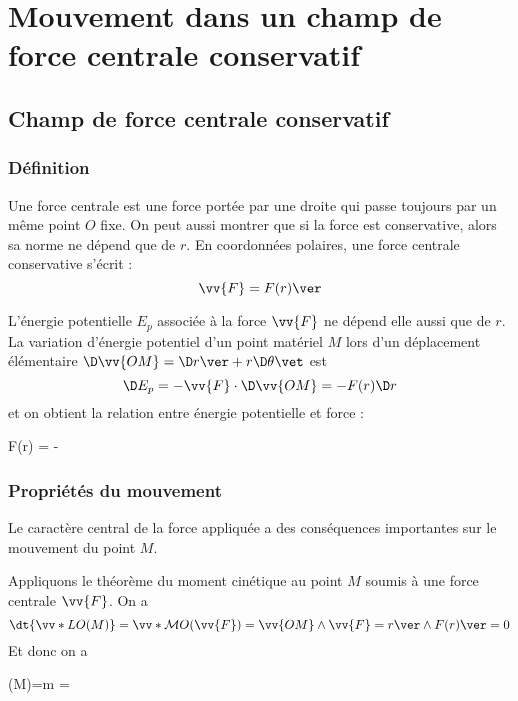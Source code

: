 \documentclass{cours}
\begin{document}
\setcounter{chapter}{17}

\chapter{Mouvement dans un champ de force centrale conservatif}

\section{Champ de force centrale conservatif}%
\label{sec:champ_de_force_centrale}

\subsection{Définition}%
\label{sub:definition}
\begin{definition}
  Une force centrale est une force portée par une droite qui passe toujours par un même point $O$ fixe. On peut aussi montrer que si la force est conservative, alors sa norme ne dépend que de $r$. En coordonnées polaires, une force centrale conservative s'écrit :
  \begin{equation}
   \vv{F} = F(r) \ver
  \end{equation}
\end{definition}
L'énergie potentielle $E_p$ associée à la force $\vv{F}$ ne dépend elle aussi que de $r$. La variation d'énergie potentiel d'un point matériel $M$ lors d'un déplacement élémentaire $\D \vv{OM} = \D r \ver +r\D \theta \vet$ est
\begin{equation}
  \D E_p = -\vv{F}\cdot\D \vv{OM} = -F(r) \D r
\end{equation}
et on obtient la relation entre énergie potentielle et force :
\begin{eqencadre}
  F(r) = - 
\end{eqencadre}

\subsection{Propriétés du mouvement}%
\label{sub:proprietes_du_mouvement}

Le caractère central de la force appliquée a des conséquences importantes sur le mouvement du point $M$. 

Appliquons le théorème du moment cinétique au point $M$ soumis à une force centrale $\vv{F}$. On a 
\begin{equation}
  \dt{\vv*{L}{O}(M)} = \vv*{\mathcal{M}}{O}(\vv{F}) = \vv{OM}\wedge\vv{F} = r \ver \wedge F(r) \ver = 0
\end{equation}
Et donc on a 
\begin{eqencadre}
  (M)=\wedge m = 
\end{eqencadre}
\end{document}
